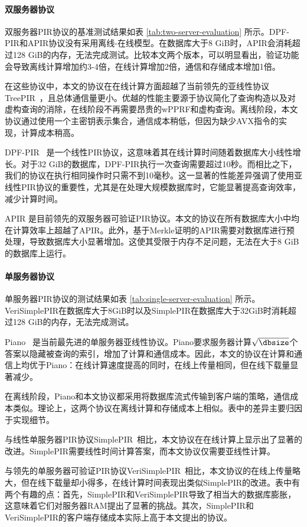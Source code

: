 \paragraph{双服务器协议}
双服务器PIR协议的基准测试结果如表 \ref{tab:two-server-evaluation} 所示。DPF-PIR和APIR协议没有采用离线-在线模型。在数据库大于8 GiB时，APIR会消耗超过128 GiB的内存，无法完成测试。比较本文两个版本，可以明显看出，验证功能会导致离线计算增加约3-4倍，在线计算增加2倍，通信和存储成本增加1倍。

在这些协议中，本文的协议在在线计算方面超越了当前领先的亚线性协议TreePIR~\cite{C:LazPap23}，且总体通信量更小。优越的性能主要源于协议简化了查询构造以及对虚构查询的消除，在线阶段不再需要昂贵的wPPRF和虚构查询。离线阶段，本文协议通过使用一个主密钥表示集合，通信成本稍低，但因为缺少AVX指令的实现，计算成本稍高。

DPF-PIR~\cite{EC:GilIsh14} 是一个线性PIR协议，这意味着其在线计算时间随着数据库大小线性增长。对于32 GiB的数据库，DPF-PIR执行一次查询需要超过10秒。而相比之下，我们的协议在执行相同操作时只需不到10毫秒。这一显著的性能差异强调了使用亚线性PIR协议的重要性，尤其是在处理大规模数据库时，它能显著提高查询效率，减少计算时间。

APIR \cite{APIR} 是目前领先的双服务器可验证PIR协议。本文的协议在所有数据库大小中均在计算效率上超越了APIR。此外，基于Merkle证明的APIR需要对数据库进行预处理，导致数据库大小显著增加。这使其受限于内存不足问题，无法在大于8 GiB的数据库上运行。

\paragraph{单服务器协议}
单服务器PIR协议的测试结果如表 \ref{tab:single-server-evaluation} 所示。VeriSimplePIR在数据库大于8GiB时以及SimplePIR在数据库大于32GiB时消耗超过128 GiB的内存，无法完成测试。

Piano~\cite{Piano} 是当前最先进的单服务器亚线性协议。Piano要求服务器计算$\sqrt{\dbsize}$个答案以隐藏被查询的索引，增加了计算和通信成本。因此，本文的协议在计算和通信上均优于Piano：在线计算速度提高的同时，在线上传量相同，但在线下载量显著减少。

在离线阶段，Piano和本文协议都采用将数据库流式传输到客户端的策略，通信成本类似。理论上，这两个协议在离线计算和存储成本上相似。表中的差异主要归因于实现细节。

与线性单服务器PIR协议SimplePIR~\cite{SimplePIR}相比，本文协议在在线计算上显示出了显著的改进。SimplePIR需要线性时间计算答案，而本文协议仅需要亚线性计算。

与领先的单服务器可验证PIR协议VeriSimplePIR~\cite{VeriSimplePIR}相比，本文协议的在线上传量略大，但在线下载量却小得多，在线计算时间表现出类似SimplePIR的改进。表中有两个有趣的点：首先，SimplePIR和VeriSimplePIR导致了相当大的数据库膨胀，这意味着它们对服务器RAM提出了显著的挑战。其次，SimplePIR和VeriSimplePIR的客户端存储成本实际上高于本文提出的协议。

